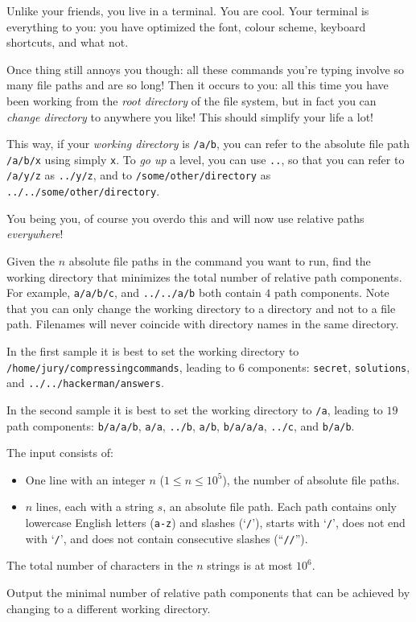 

\newcommand{\maxn}{10^5}
\newcommand{\maxs}{10^6}

Unlike your friends, you live in a terminal. You are cool. Your terminal is
everything to you: you have optimized the font, colour scheme, keyboard
shortcuts, and what not.

Once thing still annoys you though: all these commands you're typing involve so
many file paths and are so long! Then it occurs to you: all this time you have
been working from the \emph{root directory} of the file system, but in fact you
can \emph{change directory} to anywhere you like! This should simplify your life
a lot!

This way, if your \emph{working directory} is \texttt{/a/b}, you can refer to
the absolute file path \texttt{/a/b/x} using simply \texttt{x}. To \emph{go up} a
level, you can use \texttt{..}, so that you can refer to \texttt{/a/y/z}
as \texttt{../y/z}, and to \texttt{/some/other/directory} as \texttt{../../some/other/directory}.

You being you, of course you overdo this and will now use relative
paths \emph{everywhere}!

Given the $n$ absolute file paths in the command you want to run, find the
working directory that minimizes the total number of relative path components.
For example, \texttt{a/a/b/c}, and \texttt{../../a/b} both contain $4$ path components.
Note that you can only change the working directory to a directory and not to a file path.
Filenames will never coincide with directory names in the same directory.

In the first sample it is best to set the working directory
to \texttt{/home/jury/compressingcommands}, leading to $6$
components: \texttt{secret}, \texttt{solutions},
and \texttt{../../hackerman/answers}.

In the second sample it is best to set the working directory to \texttt{/a},
leading to $19$ path components: \texttt{b/a/a/b}, \texttt{a/a}, \texttt{../b}, \texttt{a/b}, \texttt{b/a/a/a}, \texttt{../c}, and \texttt{b/a/b}.

\begin{Input}
    The input consists of:
    \begin{itemize}
        \item One line with an integer $n$ ($1\leq n\leq \maxn$), the number of
    absolute file paths.
        \item $n$ lines, each with a string $s$, an absolute file path. Each path
    contains only lowercase English letters (\texttt{a-z}) and slashes
    (`\texttt{/}'), starts with `\texttt{/}', does not end with `\texttt{/}', and does not
    contain consecutive slashes (``\texttt{//}'').
    \end{itemize}
    The total number of characters in the $n$ strings is at most $\maxs$.
\end{Input}

\begin{Output}
    Output the minimal number of relative path components that can be achieved by
    changing to a different working directory.
\end{Output}
